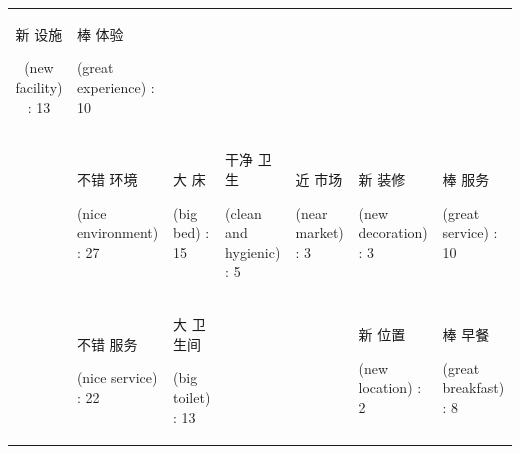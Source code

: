 \documentclass[smallextended,natbib]{svjour3}       %
\begin{document}
\begin{landscape}
\begin{table}[p]
{\begin{tabular}{|c|l|l|l|l|l|l|}
          \begin{CJK}{UTF8}{gbsn}新 设施\end{CJK} (new facility) : 13 &
          \begin{CJK}{UTF8}{gbsn}棒 体验\end{CJK} (great experience) : 10 \\
         &
          \begin{CJK}{UTF8}{gbsn}不错 环境\end{CJK} (nice environment) : 27 &
          \begin{CJK}{UTF8}{gbsn}大 床\end{CJK} (big bed) : 15 &
          \begin{CJK}{UTF8}{gbsn}干净 卫生\end{CJK} (clean and hygienic) : 5 &
          \begin{CJK}{UTF8}{gbsn}近 市场\end{CJK} (near market) : 3 &
          \begin{CJK}{UTF8}{gbsn}新 装修\end{CJK} (new decoration) : 3 &
          \begin{CJK}{UTF8}{gbsn}棒 服务\end{CJK} (great service) : 10 \\
         &
          \begin{CJK}{UTF8}{gbsn}不错 服务\end{CJK} (nice service) : 22 &
          \begin{CJK}{UTF8}{gbsn}大 卫生间\end{CJK} (big toilet) : 13 &
           &
           &
          \begin{CJK}{UTF8}{gbsn}新 位置\end{CJK} (new location) : 2 &
          \begin{CJK}{UTF8}{gbsn}棒 早餐\end{CJK} (great breakfast) : 8 \\ \hline
        \end{tabular}%
        }
    \end{table}
    \end{landscape}
\end{document}
